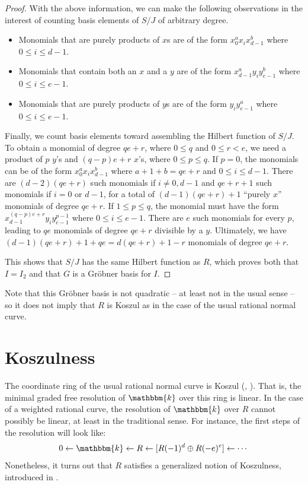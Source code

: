 \documentclass[12pt,reqno]{amsart}
\theoremstyle{definition}
\theoremstyle{remark}
\newcommand{\bbk}{\mathbbm{k}}
\begin{document}
\begin{proof}
With the above information, we can make the following observations in the interest of counting basis elements of $S/J$ of arbitrary degree. 
\begin{itemize}
    \item Monomials that are purely products of $x$s are of the form $x_0^a x_i x_{d-1}^b$ where $0 \leq i \leq d-1$. 
    \item Monomials that contain both an $x$ and a $y$ are of the form $x_{d-1}^a y_i y_{e-1}^b$ where $0 \leq i \leq e-1$.
    \item Monomials that are purely products of $y$s are of the form $y_iy_{e-1}^a$ where $0 \leq i \leq e-1$. 
\end{itemize}

Finally, we count basis elements toward assembling the Hilbert function of $S/J$. To obtain a monomial of degree $qe+r$, where $0 \leq q$ and $0 \leq r < e$, we need a product of $p$ $y$'s and $(q-p)e+r$ $x$'s, where $0 \leq p \leq q$. If $p=0$, the monomials can be of the form $x_0^ax_ix_{d-1}^b$ where $a+1+b = qe+r$ and $0 \leq i \leq d-1$. There are $(d-2)(qe+r)$ such monomials if $i \neq 0, d-1$ and $qe+r+1$ such monomials if $i=0$ or $d-1$, for a total of $(d-1)(qe+r)+1$ ``purely $x$'' monomials of degree $qe+r$. If $1 \leq p \leq q$, the monomial must have the form $x_{d-1}^{(q-p)e+r} y_i y_{e-1}^{p-1}$ where $0 \leq i \leq e-1$. There are $e$ such monomials for every $p$, leading to $qe$ monomials of degree $qe+r$ divisible by a $y$. Ultimately, we have $(d-1)(qe+r)+1 + qe = d(qe+r) + 1 - r$ monomials of degree $qe+r$. 

This shows that $S/J$ has the same Hilbert function as $R$, which proves both that $I=I_2$ and that $G$ is a Gr\"obner basis for $I$.
\end{proof}

Note that this Gr\"obner basis is not quadratic -- at least not in the usual sense -- so it does not imply that $R$ is Koszul as in the case of the usual rational normal curve.

\section{Koszulness}\label{sec:Koszulness}

The coordinate ring of the usual rational normal curve is Koszul (\cite{sGrobnerBasesConvexPolytopes, eInitialIdealsVeroneseSubrings}, \cite[Theorem~3.1.1]{cdrKoszulAlgRegularity}).  That is, the minimal graded free resolution of $\bbk$ over this ring is linear. In the case of a weighted rational curve, the resolution of $\bbk$ over $R$ cannot possibly be linear, at least in the traditional sense.  For instance, the first steps of the resolution will look like:
\[
0 \gets \bbk \gets R \gets [R(-1)^d \oplus R(-e)^e] \gets \cdots
\]
Nonetheless, it turns out that $R$ satisfies a generalized notion of Koszulness, introduced in \cite{hrwTKoszulPropIAffSemigroupRings}.
\end{document}
